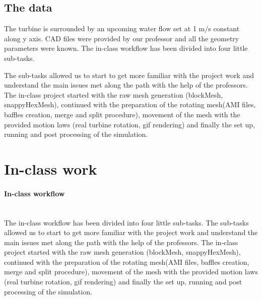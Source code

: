 \documentclass[a4paper,12pt]{article}
\begin{document}
\subsection{The data}
The turbine is surrounded by an upcoming water flow set at 1 m/s constant along y axis. 
CAD files were provided by our professor and all the geometry parameters were known.
The in-class workflow has been divided into four little sub-tasks. 

The sub-tasks allowed us to start to get more familiar with the project work and understand the main issues met along the path with the help of the professors. The in-class project started with the raw mesh generation (blockMesh, snappyHexMesh), continued with the preparation of the rotating mesh(AMI files, baffles creation, merge and split procedure), movement of the mesh with the provided motion laws  (real turbine rotation, gif rendering) and finally the set up, running and post processing of the simulation.

\section{In-class work}
\paragraph{In-class workflow}\mbox{}\\
The in-class workflow has been divided into four little sub-tasks. The sub-tasks allowed us to start to get more familiar with the project work and understand the main issues met along the path with the help of the professors. The in-class project started with the raw mesh generation (blockMesh, snappyHexMesh), continued with the preparation of the rotating mesh(AMI files, baffles creation, merge and split procedure), movement of the mesh with the provided motion laws  (real turbine rotation, gif rendering) and finally the set up, running and post processing of the simulation.
\end{document}
